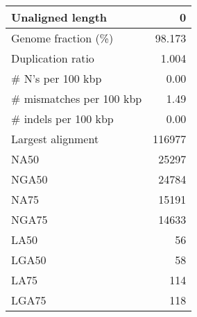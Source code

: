 \documentclass[12pt,a4paper]{article}
\begin{document}
\begin{table}[ht]
\begin{center}
\begin{tabular}{|l*{1}{|r}|}
Unaligned length & 0 \\ \hline
Genome fraction (\%) & 98.173 \\ \hline
Duplication ratio & 1.004 \\ \hline
\# N's per 100 kbp & 0.00 \\ \hline
\# mismatches per 100 kbp & 1.49 \\ \hline
\# indels per 100 kbp & 0.00 \\ \hline
Largest alignment & 116977 \\ \hline
NA50 & 25297 \\ \hline
NGA50 & 24784 \\ \hline
NA75 & 15191 \\ \hline
NGA75 & 14633 \\ \hline
LA50 & 56 \\ \hline
LGA50 & 58 \\ \hline
LA75 & 114 \\ \hline
LGA75 & 118 \\ \hline
\end{tabular}
\end{center}
\end{table}
\end{document}
